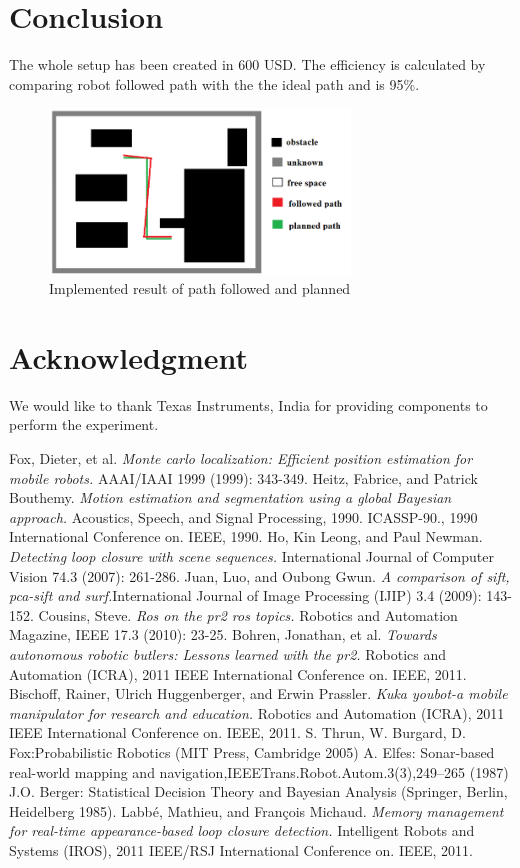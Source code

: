 \documentclass[conference]{IEEEtran}
\begin{document}
\section{Conclusion}
The whole setup has been created in 600 USD. The efficiency is calculated by comparing  robot followed path with the the ideal path and is 95\%. 
\begin{figure}[h]
\includegraphics[width=8cm]{implementedresult.png}
\centering
\caption{Implemented result of path followed and planned}\label{net_img}
\end{figure}
\section*{Acknowledgment}
We would like to thank Texas Instruments, India for providing components to perform the experiment.


\begin{thebibliography}{1}
\bibitem{}
    Fox, Dieter, et al. \emph{Monte carlo localization: Efficient position estimation for mobile robots.} AAAI/IAAI 1999 (1999): 343-349. 
\bibitem{}
    Heitz, Fabrice, and Patrick Bouthemy. \emph{Motion estimation and segmentation using a global Bayesian approach.} Acoustics, Speech, and Signal Processing, 1990. ICASSP-90., 1990 International Conference on. IEEE, 1990. 
\bibitem{}
    Ho, Kin Leong, and Paul Newman. \emph{Detecting loop closure with scene sequences.} International Journal of Computer Vision 74.3 (2007): 261-286. 
\bibitem{}
   Juan, Luo, and Oubong Gwun. \emph{A comparison of sift, pca-sift and surf.}International Journal of Image Processing (IJIP) 3.4 (2009): 143-152.
\bibitem{}
    Cousins, Steve. \emph{Ros on the pr2 ros topics.} Robotics and Automation Magazine, IEEE 17.3 (2010): 23-25.
\bibitem{}
    Bohren, Jonathan, et al. \emph{Towards autonomous robotic butlers: Lessons learned with the pr2.} Robotics and Automation (ICRA), 2011 IEEE International Conference on. IEEE, 2011.
\bibitem{}
    Bischoff, Rainer, Ulrich Huggenberger, and Erwin Prassler. \emph{Kuka youbot-a mobile manipulator for research and education.} Robotics and Automation (ICRA), 2011 IEEE International Conference on. IEEE, 2011. 
\bibitem{}
   S. Thrun, W. Burgard, D. Fox:Probabilistic Robotics (MIT Press, Cambridge 2005)
\bibitem{}
   A. Elfes: Sonar-based real-world mapping and navigation,IEEETrans.Robot.Autom.3(3),249–265 (1987) 
\bibitem{}
    J.O. Berger: Statistical Decision Theory and Bayesian Analysis (Springer, Berlin, Heidelberg 1985).
\bibitem{}
    Labbé, Mathieu, and François Michaud. \emph{Memory management for real-time appearance-based loop closure detection.} Intelligent Robots and Systems (IROS), 2011 IEEE/RSJ International Conference on. IEEE, 2011.

\end{thebibliography}
\end{document}
